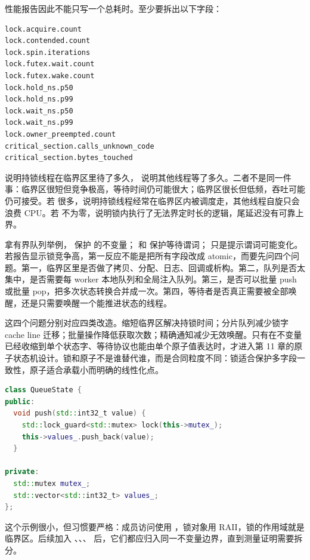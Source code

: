 性能报告因此不能只写一个总耗时。至少要拆出以下字段：

\begin{lstlisting}[numbers=none,caption={mutex 竞争报告字段}]
lock.acquire.count
lock.contended.count
lock.spin.iterations
lock.futex.wait.count
lock.futex.wake.count
lock.hold_ns.p50
lock.hold_ns.p99
lock.wait_ns.p50
lock.wait_ns.p99
lock.owner_preempted.count
critical_section.calls_unknown_code
critical_section.bytes_touched
\end{lstlisting}

 说明持锁线程在临界区里待了多久， 说明其他线程等了多久。二者不是同一件事：临界区很短但竞争极高，等待时间仍可能很大；临界区很长但低频，吞吐可能仍可接受。若  很多，说明持锁线程经常在临界区内被调度走，其他线程自旋只会浪费 CPU。若  不为零，说明锁内执行了无法界定时长的逻辑，尾延迟没有可靠上界。

拿有界队列举例， 保护  的不变量； 和  保护等待谓词； 只是提示谓词可能变化。若报告显示锁竞争高，第一反应不能是把所有字段改成 atomic，而要先问四个问题。第一，临界区里是否做了拷贝、分配、日志、回调或析构。第二，队列是否太集中，是否需要每 worker 本地队列和全局注入队列。第三，是否可以批量 push 或批量 pop，把多次状态转换合并成一次。第四，等待者是否真正需要被全部唤醒，还是只需要唤醒一个能推进状态的线程。

这四个问题分别对应四类改造。缩短临界区解决持锁时间；分片队列减少锁字 cache line 迁移；批量操作降低获取次数；精确通知减少无效唤醒。只有在不变量已经收缩到单个状态字、等待协议也能由单个原子值表达时，才进入第 11 章的原子状态机设计。锁和原子不是谁替代谁，而是合同粒度不同：锁适合保护多字段一致性，原子适合承载小而明确的线性化点。

\begin{lstlisting}[language=C++,caption={互斥锁保护队列状态转换}]
class QueueState {
public:
  void push(std::int32_t value) {
    std::lock_guard<std::mutex> lock(this->mutex_);
    this->values_.push_back(value);
  }

private:
  std::mutex mutex_;
  std::vector<std::int32_t> values_;
};
\end{lstlisting}

这个示例很小，但习惯要严格：成员访问使用 ，锁对象用 RAII，锁的作用域就是临界区。后续加入 、、、 后，它们都应归入同一不变量边界，直到测量证明需要拆分。

